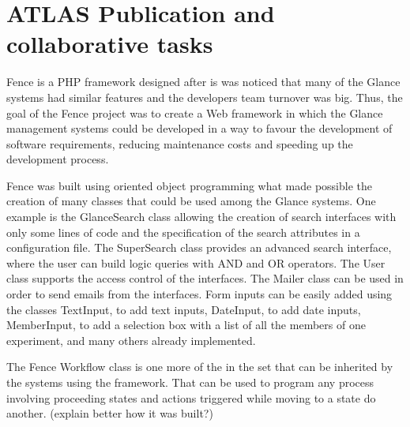 \section{ATLAS Publication and collaborative tasks}
\label{sec:collaborative-tasks}
Fence is a PHP framework designed after is was noticed that many of the Glance systems had similar features and the developers team turnover was big. Thus, the goal of the Fence project was to create a Web framework in which the Glance management systems could be developed in a way to favour the development of software requirements, reducing maintenance costs and speeding up the development process.

Fence was built using oriented object programming what made possible the creation of many classes that could be used among the Glance systems. One example is the GlanceSearch class allowing the creation of search interfaces with only some lines of code and the specification of the search attributes in a configuration file. The SuperSearch class provides an advanced search interface, where the user can build logic queries with AND and OR operators. The User class supports the access control of the interfaces. The Mailer class can be used in order to send emails from the interfaces. Form inputs can be easily added using the classes TextInput, to add text inputs, DateInput, to add date inputs, MemberInput, to add a selection box with a list of all the members of one experiment, and many others already implemented.

The Fence Workflow class is one more of the in the set that can be inherited by the systems using the framework. That can be used to program any process involving proceeding states and actions triggered while moving to a state do another. (explain better how it was built?)